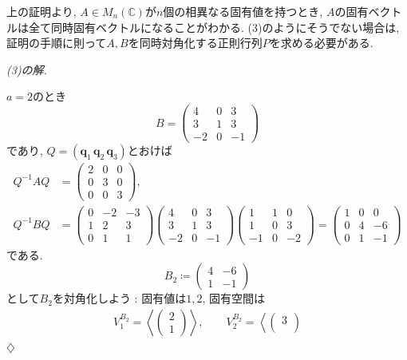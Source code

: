 \documentclass[titlepage]{jsarticle}
\numberwithin{equation}{section}
\newcommand{\C}{\mathbb{C}}%
\newenvironment{kaitou}[1][解]{%
\begin{proofbox}%
\textit{#1. }\ignorespaces
}{%
\hfill$\diamondsuit$%
\end{proofbox}%
}
\begin{document}
上の証明より, $A \in M_n(\C)$が$n$個の相異なる固有値を持つとき, $A$の固有ベクトルは全て同時固有ベクトルになることがわかる. (3)のようにそうでない場合は, 証明の手順に則って$A, B$を同時対角化する正則行列$P$を求める必要がある.
\begin{kaitou}[(3)の解]
$a = 2$のとき
\[
B = 
\begin{pmatrix}
4 & 0 & 3\\
3 & 1 & 3\\
-2 & 0 & -1
\end{pmatrix}
\]
であり, $Q = \left( \bm{q}_1\,\bm{q}_2\,\bm{q}_3 \right)$とおけば
\begin{align}
Q^{-1}AQ& = 
\begin{pmatrix}
2 & 0 & 0\\
0 & 3 & 0\\
0 & 0 & 3
\end{pmatrix}
, \label{eq:tmu2026w-1}\\
Q^{-1}BQ &=
\begin{pmatrix}
0 & -2 & -3\\
1 & 2 & 3\\
0 & 1 & 1
\end{pmatrix}
\begin{pmatrix}
4 & 0 & 3\\
3 & 1 & 3\\
-2 & 0 & -1
\end{pmatrix}
\begin{pmatrix}
1 & 1 & 0\\
1 & 0 & 3\\
-1 & 0 & -2
\end{pmatrix}
=
\left(
\begin{array}{c|cc}
1 & 0 & 0\\ \hline
0 & 4 & -6\\
0 & 1 & -1
\end{array}
\right) \label{eq:tmu2026w-2}
\end{align}
である.
\[
B_2 \coloneq
\begin{pmatrix}
4 & -6\\
1 & -1
\end{pmatrix}
\]
として$B_2$を対角化しよう : 固有値は$1, 2$, 固有空間は
\begin{align*}
V_1^{B_2} = 
\left\langle
\begin{pmatrix}
2\\
1
\end{pmatrix}
\right\rangle,\qquad
V_{2}^{B_2} = 
\left\langle
\begin{pmatrix}
3\\

\end{pmatrix}
\end{align*}
\end{kaitou}
\end{document}
